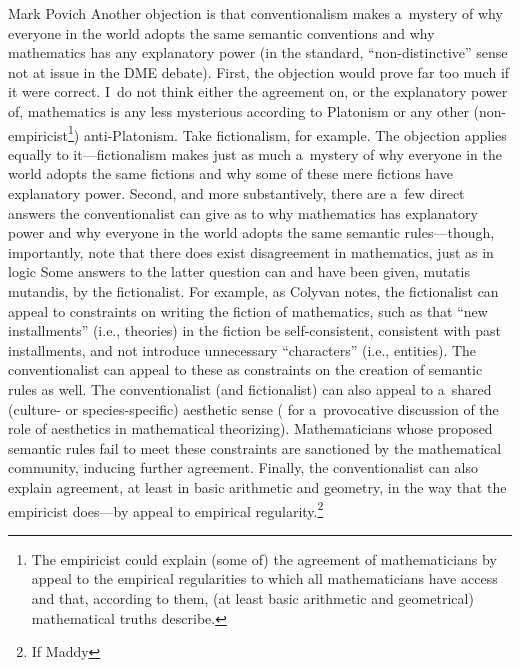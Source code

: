 \begin{artengenv}{Mark Povich}
{Another objection is that conventionalism makes a~mystery of why everyone in the world adopts the same semantic conventions and why mathematics has any explanatory power (in the standard, ``non-distinctive'' sense not at issue in the DME debate). First, the objection would prove far too much if it were correct. I~do not think either the agreement on, or the explanatory power of, mathematics is any less mysterious according to Platonism or any other (non-empiricist\footnote{The empiricist could explain (some of) the agreement of mathematicians by appeal to the empirical regularities to which all mathematicians have access and that, according to them, (at least basic arithmetic and geometrical) mathematical truths describe.}) anti-Platonism. Take fictionalism, for example. The objection applies equally to it---fictionalism makes just as much a~mystery of why everyone in the world adopts the same fictions and why some of these mere fictions have explanatory power. Second, and more substantively, there are a~few direct answers the conventionalist can give as to why mathematics has explanatory power and why everyone in the world adopts the same semantic rules---though, importantly, note that there does exist disagreement in mathematics, just as in logic
\parencites[e.g.,][]{balaguer_mathematical_2017}{beall_logical_2006}{davies_defence_2005}{priest_mathematical_2013}{priest_note_2021}
 Some answers to the latter question can and have been given, mutatis mutandis, by the fictionalist. For example, as Colyvan 
\parencite*[][]{colyvan_fictionalism_2011} %
 notes, the fictionalist can appeal to constraints on writing the fiction of mathematics, such as that ``new installments'' (i.e., theories) in the fiction be self-consistent, consistent with past installments, and not introduce unnecessary ``characters'' (i.e., entities). The conventionalist can appeal to these as constraints on the creation of semantic rules as well. The conventionalist (and fictionalist) can also appeal to a~shared (culture- or species-specific) aesthetic sense 
(\cite[see][]{steiner_applicability_1998} for a~provocative discussion of the role of aesthetics in mathematical theorizing). %
 Mathematicians whose proposed semantic rules fail to meet these constraints are sanctioned by the mathematical community, inducing further agreement. Finally, the conventionalist can also explain agreement, at least in basic arithmetic and geometry, in the way that the empiricist does---by appeal to empirical regularity.\footnote{If Maddy 
}}
\end{artengenv}

